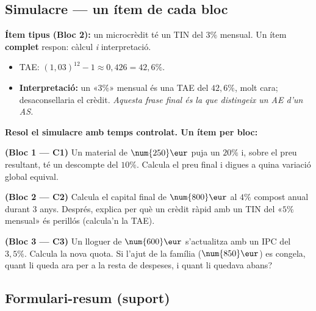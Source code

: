 \subsection{Simulacre — un ítem de cada bloc}

\begin{exemple}
\textbf{Ítem tipus (Bloc 2):} un microcrèdit té un TIN del $3\%$ mensual. Un ítem
\textbf{complet} respon: càlcul \emph{i} interpretació.
\begin{itemize}[leftmargin=1.4em, itemsep=1pt]
  \item TAE: $(1,03)^{12}-1\approx 0,426=42,6\%$.
  \item \textbf{Interpretació:} un «$3\%$» mensual és una TAE del $42,6\%$, molt cara;
        desaconsellaria el crèdit. \emph{Aquesta frase final és la que distingeix un AE
        d'un AS.}
\end{itemize}
\end{exemple}

\begin{exercicis}
\textbf{Resol el simulacre amb temps controlat. Un ítem per bloc:}
\begin{exlist}
  \item \textbf{(Bloc 1 — C1)} Un material de $\num{250}\eur$ puja un $20\%$ i, sobre el
        preu resultant, té un descompte del $10\%$. Calcula el preu final i digues a
        quina variació global equival.
  \item \textbf{(Bloc 2 — C2)} Calcula el capital final de $\num{800}\eur$ al $4\%$
        compost anual durant $3$ anys. Després, explica per què un crèdit ràpid amb un
        TIN del «$5\%$ mensual» és perillós (calcula'n la TAE).
  \item \textbf{(Bloc 3 — C3)} Un lloguer de $\num{600}\eur$ s'actualitza amb un IPC del
        $3,5\%$. Calcula la nova quota. Si l'ajut de la família ($\num{850}\eur$) es
        congela, quant li queda ara per a la resta de despeses, i quant li quedava abans?
\end{exlist}
\end{exercicis}

\subsection{Formulari-resum (suport)}

